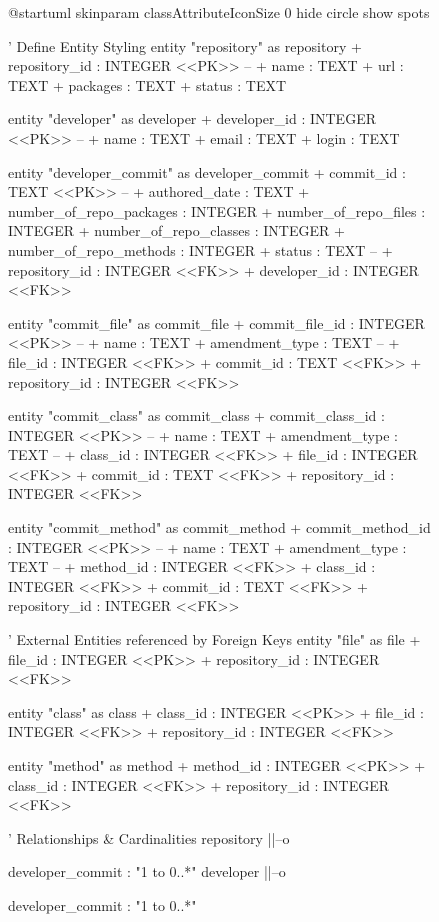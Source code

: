 \documentclass{article}
\begin{document}
\begin{landscape}
\begin{figure}[p]          %
\centering
\begin{plantuml}
@startuml
skinparam classAttributeIconSize 0
hide circle
show spots

' Define Entity Styling
entity "repository" as repository {
  + repository_id : INTEGER <<PK>>
  --
  + name : TEXT
  + url : TEXT
  + packages : TEXT
  + status : TEXT
}

entity "developer" as developer {
  + developer_id : INTEGER <<PK>>
  --
  + name : TEXT
  + email : TEXT
  + login : TEXT
}

entity "developer_commit" as developer_commit {
  + commit_id : TEXT <<PK>>
  --
  + authored_date : TEXT
  + number_of_repo_packages : INTEGER
  + number_of_repo_files : INTEGER
  + number_of_repo_classes : INTEGER
  + number_of_repo_methods : INTEGER
  + status : TEXT
  --
  + repository_id : INTEGER <<FK>>
  + developer_id : INTEGER <<FK>>
}

entity "commit_file" as commit_file {
  + commit_file_id : INTEGER <<PK>>
  --
  + name : TEXT
  + amendment_type : TEXT
  --
  + file_id : INTEGER <<FK>>
  + commit_id : TEXT <<FK>>
  + repository_id : INTEGER <<FK>>
}

entity "commit_class" as commit_class {
  + commit_class_id : INTEGER <<PK>>
  --
  + name : TEXT
  + amendment_type : TEXT
  --
  + class_id : INTEGER <<FK>>
  + file_id : INTEGER <<FK>>
  + commit_id : TEXT <<FK>>
  + repository_id : INTEGER <<FK>>
}

entity "commit_method" as commit_method {
  + commit_method_id : INTEGER <<PK>>
  --
  + name : TEXT
  + amendment_type : TEXT
  --
  + method_id : INTEGER <<FK>>
  + class_id : INTEGER <<FK>>
  + commit_id : TEXT <<FK>>
  + repository_id : INTEGER <<FK>>
}

' External Entities referenced by Foreign Keys
entity "file" as file {
  + file_id : INTEGER <<PK>>
  + repository_id : INTEGER <<FK>>
}

entity "class" as class {
  + class_id : INTEGER <<PK>>
  + file_id : INTEGER <<FK>>
  + repository_id : INTEGER <<FK>>
}

entity "method" as method {
  + method_id : INTEGER <<PK>>
  + class_id : INTEGER <<FK>>
  + repository_id : INTEGER <<FK>>
}

' Relationships & Cardinalities
repository ||--o{ developer_commit : "1 to 0..*"
developer  ||--o{ developer_commit : "1 to 0..*"

}}
\end{plantuml}
\end{figure}
\end{landscape}
\end{document}
